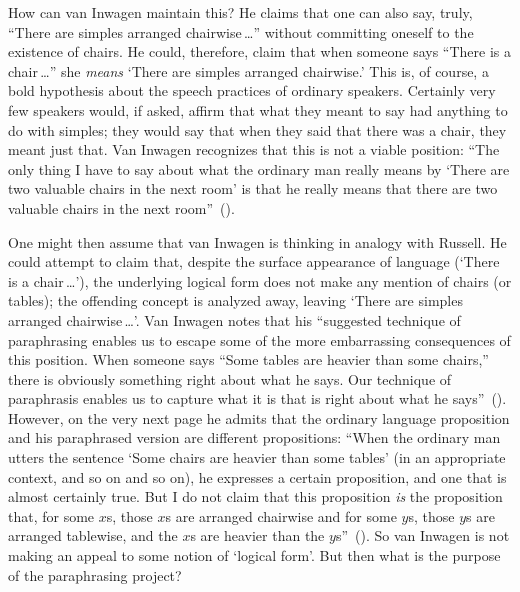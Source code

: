 \documentclass[11pt]{article}
\begin{document}
\begin{spacing}{1.5}
How can van Inwagen maintain this? He claims that one can also say,
truly, ``There are simples arranged chairwise\,\ldots '' without
committing oneself to the existence of chairs.  He could, therefore,
claim that when someone says ``There is a chair\,\ldots '' she {\em
  means} `There are simples arranged chairwise.' This is, of course, a
bold hypothesis about the speech practices of ordinary speakers.
Certainly very few speakers would, if asked, affirm that what they
meant to say had anything to do with simples; they would say that when
they said that there was a chair, they meant just that.  Van Inwagen
recognizes that this is not a viable position: ``The only thing I have
to say about what the ordinary man really means by `There are two
valuable chairs in the next room' is that he really means that there
are two valuable chairs in the next
room''~(\citeyear[106]{inwagen1995}).

One might then assume that van Inwagen is thinking in analogy with
Russell.  He could attempt to claim that, despite the surface
appearance of language (`There is a chair\,\ldots '), the underlying
logical form does not make any mention of chairs (or tables); the
offending concept is analyzed away, leaving `There are simples
arranged chairwise\,\ldots '.  Van Inwagen notes that his ``suggested
technique of paraphrasing enables us to escape some of the more
embarrassing consequences of this position.  When someone says ``Some
tables are heavier than some chairs,'' there is obviously something
right about what he says.  Our technique of paraphrasis enables us to
capture what it is that is right about what he
says''~(\citeyear[111]{inwagen1995}).  However, on the very next page
he admits that the ordinary language proposition and his paraphrased
version are different propositions: ``When the ordinary man utters the
sentence `Some chairs are heavier than some tables' (in an appropriate
context, and so on and so on), he expresses a certain proposition, and
one that is almost certainly true.  But I do not claim that this
proposition {\em is} the proposition that, for some $x$s, those $x$s
are arranged chairwise and for some $y$s, those $y$s are arranged
tablewise, and the $x$s are heavier than the
$y$s''~(\citeyear[112]{inwagen1995}).  So van Inwagen is not making an
appeal to some notion of `logical form'.  But then what is the purpose
of the paraphrasing project?


\end{spacing}
\end{document}
